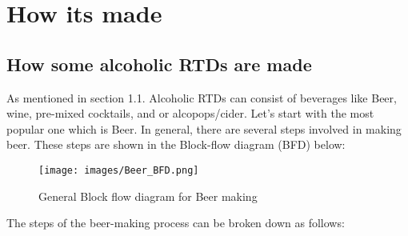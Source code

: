 \chapter{How its made}
\section{How some alcoholic RTDs are made}
As mentioned in section 1.1. Alcoholic RTDs can consist of beverages like Beer, wine, pre-mixed  cocktails, and or alcopops/cider. Let's start with the most popular one which is Beer. 
In general, there are several steps involved in making beer. These steps are shown in the Block-flow diagram (BFD) below:
\begin{figure}[H]
    \centering
    \texttt{[image: images/Beer\_BFD.png]}
    \caption{General Block flow diagram for Beer making}
    \label{fig:beer}
\end{figure}
The steps of the beer-making process can be broken down as follows: 
